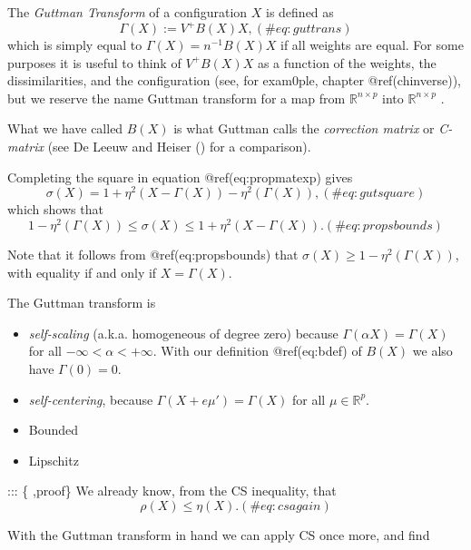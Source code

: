 \documentclass[
  12pt,
  letterpaper,
  DIV=11,
  numbers=noendperiod]{scrreprt}
\theoremstyle{remark}
\begin{document}
The \emph{Guttman Transform} of a configuration \(X\) is defined as
\begin{equation}
\Gamma(X):=V^+B(X)X,
(\#eq:guttrans)
\end{equation} which is simply equal to \(\Gamma(X)=n^{-1}B(X)X\) if all
weights are equal. For some purposes it is useful to think of
\(V^+B(X)X\) as a function of the weights, the dissimilarities, and the
configuration (see, for exam0ple, chapter @ref(chinverse)), but we
reserve the name Guttman transform for a map from
\(\mathbb{R}^{n\times p}\) into \(\mathbb{R}^{n\times p}\) .

What we have called \(B(X)\) is what Guttman calls the \emph{correction
matrix} or \emph{C-matrix} (see De Leeuw and Heiser
() for a comparison).

Completing the square in equation @ref(eq:propmatexp) gives
\begin{equation}
\sigma(X)=1+\eta^2(X-\Gamma(X))-\eta^2(\Gamma(X)),
(\#eq:gutsquare)
\end{equation} which shows that \begin{equation}
1-\eta^2(\Gamma(X))\leq\sigma(X)\leq 1+\eta^2(X-\Gamma(X)).
(\#eq:propsbounds)
\end{equation}

Note that it follows from @ref(eq:propsbounds) that
\(\sigma(X)\geq 1-\eta^2(\Gamma(X))\), with equality if and only if
\(X=\Gamma(X)\).

The Guttman transform is

\begin{itemize}
\item
  \emph{self-scaling} (a.k.a. homogeneous of degree zero) because
  \(\Gamma(\alpha X)=\Gamma(X)\) for all \(-\infty<\alpha<+\infty\).
  With our definition @ref(eq:bdef) of \(B(X)\) we also have
  \(\Gamma(0)=0\).
\item
  \emph{self-centering}, because \(\Gamma(X+e\mu')=\Gamma(X)\) for all
  \(\mu\in\mathbb{R}^p\).
\item
  Bounded
\item
  Lipschitz
\end{itemize}

::: \{ ,proof\} We already know, from the CS inequality, that
\begin{equation}
\rho(X)\leq\eta(X).
(\#eq:csagain)
\end{equation}

With the Guttman transform in hand we can apply CS once more, and find
\end{document}
